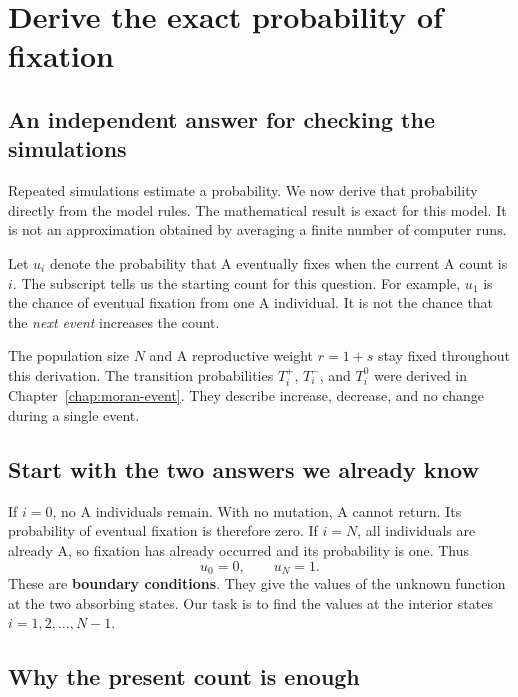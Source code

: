 \chapter{Derive the exact probability of fixation}
\label{chap:exact}

\section{An independent answer for checking the simulations}

Repeated simulations estimate a probability. We now derive that probability
directly from the model rules. The mathematical result is exact for this
model. It is not an approximation obtained by averaging a finite number of
computer runs.

Let \(u_i\) denote the probability that A eventually fixes when the current
A count is \(i\). The subscript tells us the starting count for this question.
For example, \(u_1\) is the chance of eventual fixation from one A individual.
It is not the chance that the \emph{next event} increases the count.

The population size \(N\) and A reproductive weight \(r=1+s\) stay fixed
throughout this derivation. The transition probabilities \(T_i^+\),
\(T_i^-\), and \(T_i^0\) were derived in
Chapter~\ref{chap:moran-event}. They describe increase, decrease, and no
change during a single event.

\section{Start with the two answers we already know}

If \(i=0\), no A individuals remain. With no mutation, A cannot return.
Its probability of eventual fixation is therefore zero. If \(i=N\), all
individuals are already A, so fixation has already occurred and its
probability is one. Thus
\begin{equation}
 u_0=0,\qquad u_N=1.
 \label{eq:fixation-boundaries}
\end{equation}
These are \textbf{boundary conditions}. They give the values of the unknown
function at the two absorbing states. Our task is to find the values at
the interior states \(i=1,2,\ldots,N-1\).

\section{Why the present count is enough}

